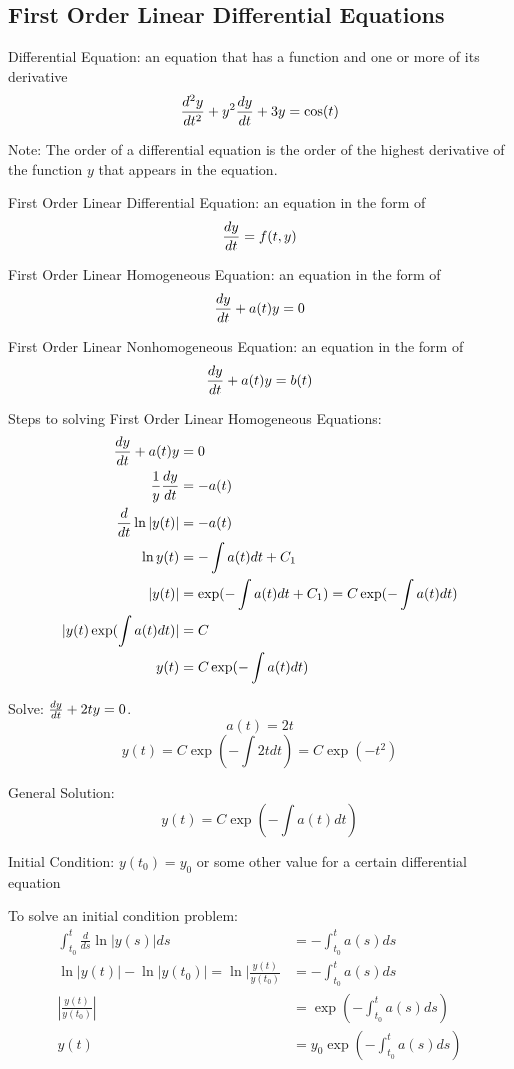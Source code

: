 \documentclass[12pt]{article}
\begin{document}
\subsection{First Order Linear Differential Equations} 
\begin{definition} Differential Equation: an equation that has a function and one or more of its derivative $$ \frac{d^2y}{dt^2} + y^2\frac{dy}{dt} + 3y = \cos(t) $$ \end{definition}
Note: The order of a differential equation is the order of the highest derivative of the function $y$ that appears in the equation. 
\begin{definition} First Order Linear Differential Equation: an equation in the form of 
$$\frac{dy}{dt} = f(t, y)$$ \end{definition}
\begin{definition} First Order Linear Homogeneous Equation: an equation in the form of 
$$\frac{dy}{dt} + a(t)y = 0$$ \end{definition}
\begin{definition} First Order Linear Nonhomogeneous Equation: an equation in the form of $$\frac{dy}{dt} + a(t)y = b(t) $$ \end{definition} 
Steps to solving First Order Linear Homogeneous Equations: $$\begin{aligned} 
\frac{dy}{dt} + a(t)y &= 0 \\ \frac{1}{y}\frac{dy}{dt} &= -a(t) \\ \frac{d}{dt} \ln|y(t)| &= -a(t) \\ \ln y(t) &= -\int a(t)dt + C_1 \\ |y(t)| &= \exp(-\int a(t)dt + C_1) = C\exp(-\int a(t) dt) \\ |y(t)\exp(\int a(t)dt)| &= C \\ y(t) &= C\exp(-\int a(t)dt) \end{aligned} $$ 
\begin{example} Solve: $\frac{dy}{dt} + 2ty = 0$. $$a(t) = 2t$$ $$y(t) = C\exp(-\int 2tdt) = C\exp(-t^2) $$ \end{example}
\begin{definition} General Solution: $$y(t) = C\exp(-\int a(t) dt) $$ \end{definition} 
\begin{definition} Initial Condition: $y(t_0) = y_0$ or some other value for a certain differential equation \end{definition} 
To solve an initial condition problem: $$\begin{aligned} \int_{t_0}^t \frac{d}{ds}\ln|y(s)|ds &= -\int_{t_0}^t a(s)ds \\ \ln|y(t)| - \ln|y(t_0)| = \ln|\frac{y(t)}{y(t_0)} &= -\int_{t_0}^t a(s)ds \\ |\frac{y(t)}{y(t_0)}| &= \exp(-\int_{t_0}^t a(s)ds) \\ y(t) &= y_0\exp(-\int_{t_0}^t a(s)ds) \end{aligned} $$ 
\end{document}

